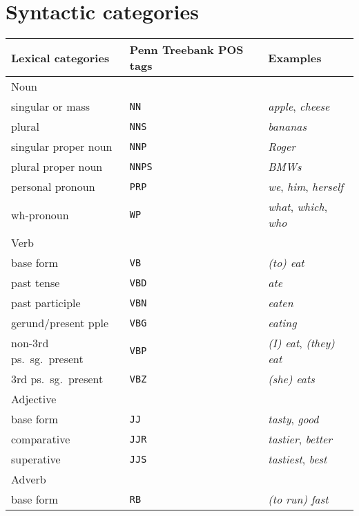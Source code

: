 \documentclass[letterpaper, 10pt]{article}
\begin{document}
\section{Syntactic categories}
\begin{table}[H]
\centering
\begin{tabular}{lll}
\toprule
\textbf{Lexical categories}		& \textbf{Penn Treebank POS tags}		& \textbf{Examples}\\
\midrule
Noun					&								&\\
\quad{}singular or mass		& \texttt{NN}						& \textit{apple}, \textit{cheese}\\ 
\quad{}plural				& \texttt{NNS}						& \textit{bananas}\\
\quad{}singular proper noun	& \texttt{NNP}						& \textit{Roger}\\
\quad{}plural proper noun		& \texttt{NNPS}						& \textit{BMWs}\\
\quad{}personal pronoun			& \texttt{PRP}						& \textit{we}, \textit{him}, \textit{herself}\\
\quad{}wh-pronoun				& \texttt{WP}						& \textit{what}, \textit{which}, \textit{who}\\
Verb					&&\\
\quad{}base form			& \texttt{VB}						& \textit{(to) eat}\\
\quad{}past tense			& \texttt{VBD}						& \textit{ate}\\
\quad{}past participle			& \texttt{VBN}						& \textit{eaten}\\
\quad{}gerund/present pple	& \texttt{VBG}						& \textit{eating}\\
\quad{}non-3rd ps.\ sg.\ present	& \texttt{VBP}						& \textit{(I) eat}, \textit{(they) eat}\\
\quad{}3rd ps.\ sg.\ present	& \texttt{VBZ}						& \textit{(she) eats}\\
Adjective					&&\\
\quad{}base form			& \texttt{JJ}						& \textit{tasty}, \textit{good}\\
\quad{}comparative			& \texttt{JJR}						& \textit{tastier}, \textit{better}\\
\quad{}superative			& \texttt{JJS}						& \textit{tastiest}, \textit{best}\\
Adverb					&&\\
\quad{}base form			& \texttt{RB}						& \textit{(to run) fast}\\

\end{tabular}
\end{table}
\end{document}
